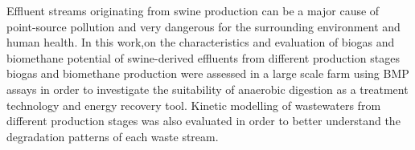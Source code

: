 Effluent streams originating from swine production can be a major cause of point-source pollution and very dangerous for the surrounding environment and human health. In this work,on the characteristics and evaluation of biogas and biomethane potential of swine-derived effluents from different production stages biogas and biomethane production were assessed in a large scale farm using BMP assays in order to investigate the suitability of anaerobic digestion as a treatment technology and energy recovery tool. Kinetic modelling of wastewaters from different production stages was also evaluated in order to better understand the degradation patterns of each waste stream.